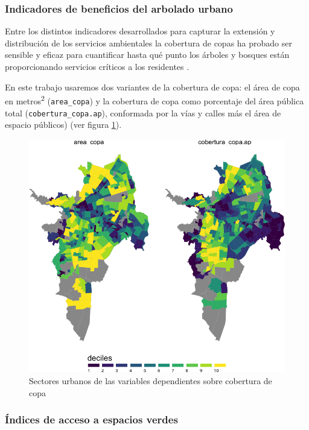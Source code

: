\documentclass[12pt,]{book}
\begin{document}
\subsubsection{Indicadores de beneficios del arbolado
urbano}\label{indicadores-de-beneficios-del-arbolado-urbano}

Entre los distintos indicadores desarrollados para capturar la extensión
y distribución de los servicios ambientales la cobertura de copas ha
probado ser sensible y eficaz para cuantificar hasta qué punto los
árboles y bosques están proporcionando servicios críticos a los
residentes \citep{nowak_sustaining_2010}.

En este trabajo usaremos dos variantes de la cobertura de copa: el área
de copa en metros\textsuperscript{2} (\texttt{area\_copa}) y la
cobertura de copa como porcentaje del área pública total
(\texttt{cobertura\_copa.ap}), conformada por la vías y calles más el
área de espacio públicos) (ver figura \ref{fig:mapa-copa-dep}).

\begin{figure}
\includegraphics[width=1\linewidth]{tesis-unigis_files/figure-latex/mapa-copa-dep-1} \caption{Sectores urbanos de las variables dependientes sobre cobertura de copa}\label{fig:mapa-copa-dep}
\end{figure}

\subsubsection{Índices de acceso a espacios
verdes}\label{indices-de-acceso-a-espacios-verdes}
\end{document}
